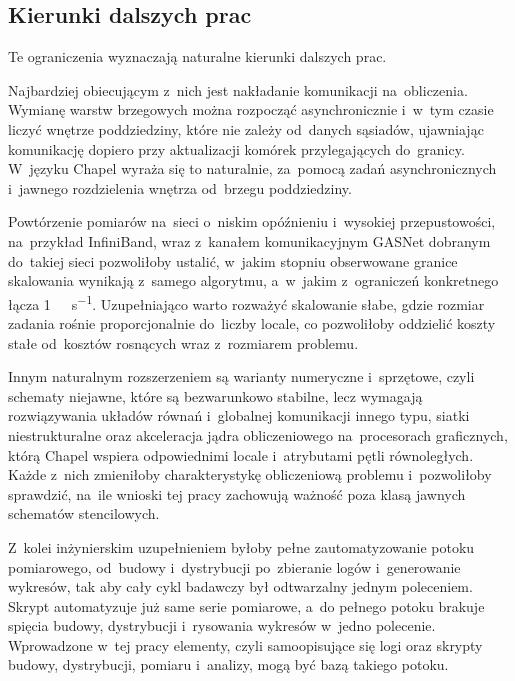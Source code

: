 \subsection{Kierunki dalszych prac}
\label{sec:dalsze-prace}

Te ograniczenia wyznaczają naturalne kierunki dalszych prac.

Najbardziej obiecującym z~nich jest nakładanie komunikacji na~obliczenia. Wymianę
warstw brzegowych można rozpocząć asynchronicznie i~w~tym czasie liczyć wnętrze poddziedziny,
które nie zależy od~danych sąsiadów, ujawniając komunikację dopiero przy aktualizacji komórek
przylegających do~granicy. W~języku Chapel wyraża się to naturalnie, za~pomocą zadań
asynchronicznych i~jawnego rozdzielenia wnętrza od~brzegu poddziedziny.

Powtórzenie pomiarów na~sieci o~niskim opóźnieniu i~wysokiej przepustowości, na~przykład
InfiniBand, wraz z~kanałem komunikacyjnym GASNet dobranym do~takiej sieci pozwoliłoby ustalić, w~jakim stopniu
obserwowane granice skalowania wynikają z~samego algorytmu, a~w~jakim z~ograniczeń konkretnego
łącza \SI{1}{\giga\bit\per\second}. Uzupełniająco warto rozważyć skalowanie słabe, gdzie
rozmiar zadania rośnie proporcjonalnie do~liczby locale, co pozwoliłoby oddzielić koszty stałe
od~kosztów rosnących wraz z~rozmiarem problemu.

Innym naturalnym rozszerzeniem są warianty numeryczne i~sprzętowe, czyli schematy niejawne,
które są bezwarunkowo stabilne, lecz wymagają rozwiązywania układów równań i~globalnej komunikacji
innego typu, siatki niestrukturalne oraz akceleracja jądra obliczeniowego na~procesorach graficznych,
którą Chapel wspiera odpowiednimi locale i~atrybutami pętli równoległych. Każde z~nich zmieniłoby
charakterystykę obliczeniową problemu i~pozwoliłoby sprawdzić, na~ile wnioski tej pracy zachowują
ważność poza klasą jawnych schematów stencilowych.

Z~kolei inżynierskim uzupełnieniem byłoby pełne zautomatyzowanie potoku pomiarowego,
od~budowy i~dystrybucji po~zbieranie logów i~generowanie wykresów, tak aby cały cykl badawczy
był odtwarzalny jednym poleceniem. Skrypt  automatyzuje już same serie pomiarowe,
a~do pełnego potoku brakuje spięcia budowy, dystrybucji i~rysowania wykresów w~jedno polecenie.
Wprowadzone w~tej pracy elementy, czyli samoopisujące się logi oraz skrypty budowy, dystrybucji,
pomiaru i~analizy, mogą być bazą takiego potoku.
